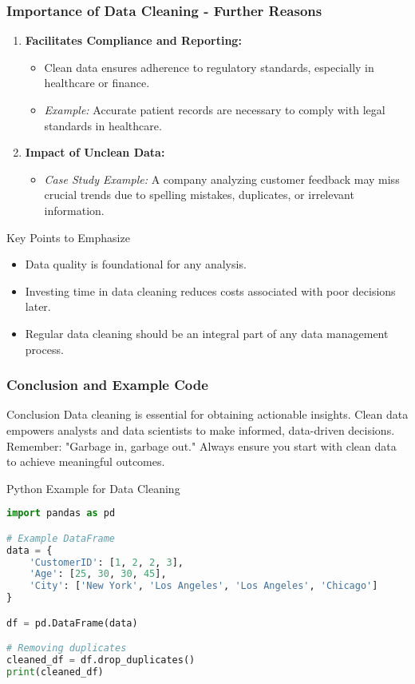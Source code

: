 \documentclass{beamer}
\begin{document}
\begin{frame}
    \frametitle{Importance of Data Cleaning - Further Reasons}
    \begin{enumerate}[resume]
        \item \textbf{Facilitates Compliance and Reporting:}
            \begin{itemize}
                \item Clean data ensures adherence to regulatory standards, especially in healthcare or finance.
                \item \textit{Example:} Accurate patient records are necessary to comply with legal standards in healthcare.
            \end{itemize}

        \item \textbf{Impact of Unclean Data:}
            \begin{itemize}
                \item \textit{Case Study Example:} A company analyzing customer feedback may miss crucial trends due to spelling mistakes, duplicates, or irrelevant information.
            \end{itemize}
    \end{enumerate}

    \begin{block}{Key Points to Emphasize}
        \begin{itemize}
            \item Data quality is foundational for any analysis.
            \item Investing time in data cleaning reduces costs associated with poor decisions later.
            \item Regular data cleaning should be an integral part of any data management process.
        \end{itemize}
    \end{block}
\end{frame}

\begin{frame}[fragile]
    \frametitle{Conclusion and Example Code}
    \begin{block}{Conclusion}
        Data cleaning is essential for obtaining actionable insights. Clean data empowers analysts and data scientists to make informed, data-driven decisions. Remember: "Garbage in, garbage out." Always ensure you start with clean data to achieve meaningful outcomes.
    \end{block}

    \begin{block}{Python Example for Data Cleaning}
        \begin{lstlisting}[language=Python]
import pandas as pd

# Example DataFrame
data = {
    'CustomerID': [1, 2, 2, 3],
    'Age': [25, 30, 30, 45],
    'City': ['New York', 'Los Angeles', 'Los Angeles', 'Chicago']
}

df = pd.DataFrame(data)

# Removing duplicates
cleaned_df = df.drop_duplicates()
print(cleaned_df)
        \end{lstlisting}
    \end{block}
\end{frame}
\end{document}
